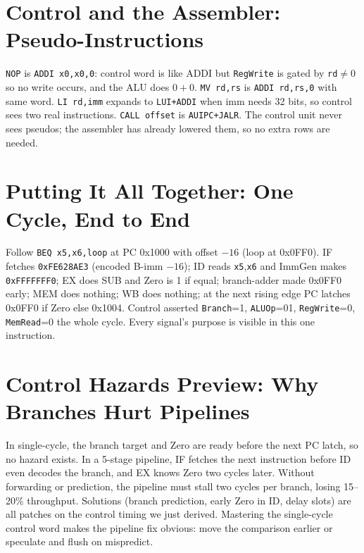 \section{Control and the Assembler: Pseudo-Instructions}
\texttt{NOP} is \texttt{ADDI x0,x0,0}: control word is like ADDI but \texttt{RegWrite} is gated by \texttt{rd}$\neq$0 so no write occurs, and the ALU does $0+0$. \texttt{MV rd,rs} is \texttt{ADDI rd,rs,0} with same word. \texttt{LI rd,imm} expands to \texttt{LUI+ADDI} when imm needs 32 bits, so control sees two real instructions. \texttt{CALL offset} is \texttt{AUIPC+JALR}. The control unit never sees pseudos; the assembler has already lowered them, so no extra rows are needed.

\section{Putting It All Together: One Cycle, End to End}
Follow \texttt{BEQ x5,x6,loop} at PC 0x1000 with offset $-16$ (loop at 0x0FF0). IF fetches \texttt{0xFE628AE3} (encoded B-imm $-16$); ID reads \texttt{x5},\texttt{x6} and ImmGen makes \texttt{0xFFFFFFF0}; EX does SUB and Zero is 1 if equal; branch-adder made 0x0FF0 early; MEM does nothing; WB does nothing; at the next rising edge PC latches 0x0FF0 if Zero else 0x1004. Control asserted \texttt{Branch}=1, \texttt{ALUOp}=01, \texttt{RegWrite}=0, \texttt{MemRead}=0 the whole cycle. Every signal's purpose is visible in this one instruction.

\begin{center}
\end{center}


\section{Control Hazards Preview: Why Branches Hurt Pipelines}
In single-cycle, the branch target and Zero are ready before the next PC latch, so no hazard exists. In a 5-stage pipeline, IF fetches the next instruction before ID even decodes the branch, and EX knows Zero two cycles later. Without forwarding or prediction, the pipeline must stall two cycles per branch, losing 15--20\% throughput. Solutions (branch prediction, early Zero in ID, delay slots) are all patches on the control timing we just derived. Mastering the single-cycle control word makes the pipeline fix obvious: move the comparison earlier or speculate and flush on mispredict.

